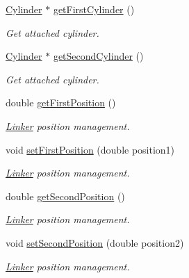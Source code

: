 {\bf }\par
\begin{DoxyCompactItemize}
\item 
\hyperlink{classCylinder}{Cylinder} $\ast$ \hyperlink{classLinker_a5cb37f37606e5f76f105e4f11a55a0a4}{get\+First\+Cylinder} ()
\begin{DoxyCompactList}\small\item\em Get attached cylinder. \end{DoxyCompactList}\item 
\hyperlink{classCylinder}{Cylinder} $\ast$ \hyperlink{classLinker_a7f7e3c20b80a578cd8060770b24cba80}{get\+Second\+Cylinder} ()
\begin{DoxyCompactList}\small\item\em Get attached cylinder. \end{DoxyCompactList}\end{DoxyCompactItemize}

{\bf }\par
\begin{DoxyCompactItemize}
\item 
double \hyperlink{classLinker_a8b92727910c0a6d6c171d26a87305109}{get\+First\+Position} ()
\begin{DoxyCompactList}\small\item\em \hyperlink{classLinker}{Linker} position management. \end{DoxyCompactList}\item 
void \hyperlink{classLinker_ae7f0b6b41a3e2a4ee9cba35370c930f8}{set\+First\+Position} (double position1)
\begin{DoxyCompactList}\small\item\em \hyperlink{classLinker}{Linker} position management. \end{DoxyCompactList}\item 
double \hyperlink{classLinker_a38d56541e9e262641a5d5281f1aac174}{get\+Second\+Position} ()
\begin{DoxyCompactList}\small\item\em \hyperlink{classLinker}{Linker} position management. \end{DoxyCompactList}\item 
void \hyperlink{classLinker_a3765490ad3094ce06e574449dc45aae4}{set\+Second\+Position} (double position2)
\begin{DoxyCompactList}\small\item\em \hyperlink{classLinker}{Linker} position management. \end{DoxyCompactList}\end{DoxyCompactItemize}

